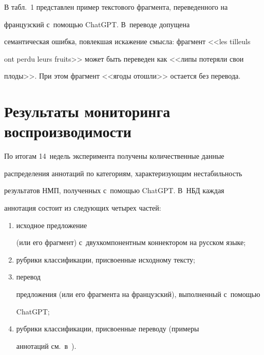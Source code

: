    


   


   В табл.~1 представлен пример текстового фраг\-мен\-та, переведенного на 


французский с~по\-мощью \mbox{ChatGPT}. В~переводе допущена 


семантическая ошиб\-ка, по\-влек\-шая искажение смысла: фрагмент <<les tilleuls 


ont perdu leurs fruits>> может быть переведен как <<липы потеряли свои 


плоды>>. При этом фрагмент <<ягоды ото\-шли>> остается без пе\-ре\-вода. 





\section{Результаты мониторинга воспроизводимости}


   


   По итогам 14~недель эксперимента получены количественные данные 


распределения аннотаций по категориям, ха\-рак\-те\-ри\-зу\-ющим не\-ста\-биль\-ность 


результатов НМП, полученных с~по\-мощью \mbox{ChatGPT}. В~НБД каждая 


аннотация со\-сто\-ит из сле\-ду\-ющих четырех час\-тей:


\begin{enumerate}[(1)]


\item исходное предложение 


(или его фрагмент) с~двухкомпонентным коннектором на русском языке; 


\item руб\-ри\-ки классификации, присвоенные исходному текс\-ту; 


\item перевод 


предложения (или его фрагмента на французский), выполненный с~по\-мощью 


\mbox{ChatGPT};


\item руб\-ри\-ки классификации, при\-сво\-ен\-ные переводу (примеры 


аннотаций см.\ в~\cite{22-eg}).


\end{enumerate}





